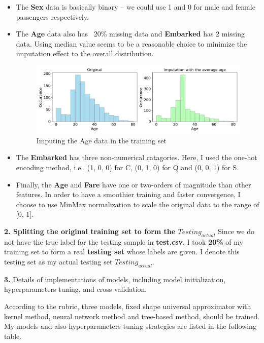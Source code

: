 \begin{itemize}
    \item The \textbf{Sex} data is basically binary -- we could use 1 and 0 for male and female passengers respectively.
    \item The \textbf{Age} data also has ~20\% missing data and \textbf{Embarked} has 2 missing data. Using median value seems to be a reasonable choice to minimize the imputation effect to the overall distribution.
    
        \begin{figure}[H]
            \centering
            \includegraphics[width=160mm]{imputation_age.png}
            \caption{Imputing the Age data in the training set}
            \label{imputation of the age data}
        \end{figure} 

    \item The \textbf{Embarked} has three non-numerical catagories. Here, I used the one-hot encoding method, i.e., (1, 0, 0) for C, (0, 1, 0) for Q and (0, 0, 1) for S.
    \item Finally, the \textbf{Age} and \textbf{Fare} have one or two-orders of magnitude than other features. In order to have a smoothier training and faster convergence, I choose to use MinMax normalization to scale the original data to the range of [0, 1].
\end{itemize}

\textbf{2. Splitting the original training set to form the $Testing_{actual}$}
Since we do not have the true label for the testing sample in \textbf{test.csv}, I took \textbf{20\%} of my training set to form a real \textbf{testing set} whose labels are given. I denote this testing set as my actual testing set $Testing_{actual}$.


\textbf{3.} Details of implementations of models, including model initialization, hyperparameters tuning, and cross validation.

According to the rubric, three models, fixed shape universal approximator with kernel method, neural network method and tree-based method, should be trained. My models and also hyperparameters tuning strategies are listed in the following table. 


